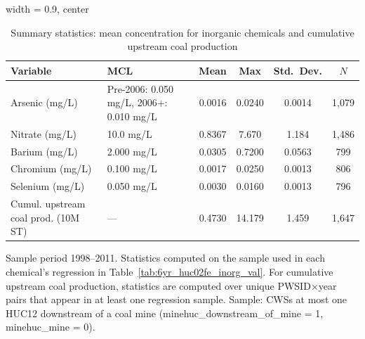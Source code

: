 
\begin{table}[htbp]
   \caption{\label{tab:6yr_huc02fe_inorg_val_sumstats} Summary statistics: mean concentration for inorganic chemicals and cumulative upstream coal production}
   \bigskip
   \centering
   \begin{adjustbox}{width = 0.9\textwidth, center}
      \begin{tabular}{lp{3.8cm}cccc}
         \toprule
         Variable & MCL & Mean & Max & Std.\ Dev. & $N$ \\
         \midrule
         Arsenic (mg/L) & Pre-2006: 0.050 mg/L, 2006+: 0.010 mg/L & 0.0016 & 0.0240 & 0.0014 & 1,079 \\
         Nitrate (mg/L) & 10.0 mg/L & 0.8367 & 7.670 & 1.184 & 1,486 \\
         Barium (mg/L) & 2.000 mg/L & 0.0305 & 0.7200 & 0.0563 & 799 \\
         Chromium (mg/L) & 0.100 mg/L & 0.0017 & 0.0250 & 0.0013 & 806 \\
         Selenium (mg/L) & 0.050 mg/L & 0.0030 & 0.0160 & 0.0013 & 796 \\
         Cumul. upstream coal prod. (10M ST) & --- & 0.4730 & 14.179 & 1.459 & 1,647 \\
         \bottomrule
      \end{tabular}
   \end{adjustbox}
   {\tiny\linespread{1}\selectfont \par \raggedright Sample period 1998--2011. Statistics computed on the sample used in each chemical's regression in Table~\ref{tab:6yr_huc02fe_inorg_val}. For cumulative upstream coal production, statistics are computed over unique PWSID$\times$year pairs that appear in at least one regression sample. Sample: CWSs at most one HUC12 downstream of a coal mine (minehuc\_downstream\_of\_mine = 1, minehuc\_mine = 0).}
\end{table}

